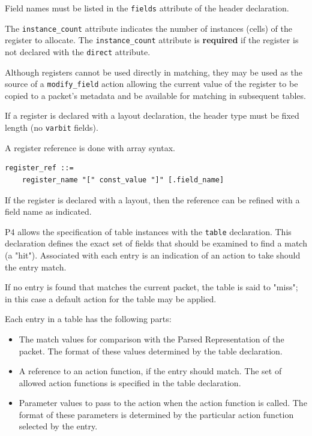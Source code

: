 \documentclass[12pt]{article}
\begin{document}
Field names must be listed in the \texttt{fields} attribute of the 
header declaration. 

The \texttt{instance_count} attribute indicates the number of 
instances (cells) of the register to allocate. The 
\texttt{instance_count} attribute is \textbf{required} if the 
register is not declared with the \texttt{direct} attribute.

Although registers cannot be used directly in matching, they may be used as 
the source of a \texttt{modify_field} action allowing the current value 
of the register to be copied to a packet's metadata and be available 
for matching in subsequent tables.

If a register is declared with a layout declaration, the header type must 
be fixed length (no \texttt{varbit} fields).

A register reference is done with array syntax.

\begin{lstlisting}[style=BNFstyle]
register_ref ::=
    register_name "[" const_value "]" [.field_name]
\end{lstlisting}


If the register is declared with a layout, then the reference can be refined 
with a field name as indicated.



P4 allows the specification of table instances with the \texttt{table}
declaration. This declaration defines the exact set of fields that
should be examined to find a match (a "hit").  Associated with each
entry is an indication of an action to take should the entry match.

If no entry is found that matches the current packet, the table is said to 
"miss"; in this case a default action for the table may be applied.

Each entry in a \matchaction table has the following parts: 

\begin{itemize}
\item
The match values for comparison with the Parsed Representation of the packet. 
The format of these values determined by the table declaration.
\item
A reference to an action function, if the entry should match. The set
of allowed action functions is specified in the table declaration.
\item
Parameter values to pass to the action when the action function is called. 
The format of these parameters is determined by the particular action function 
selected by the entry.
\end{itemize}
\end{document}
